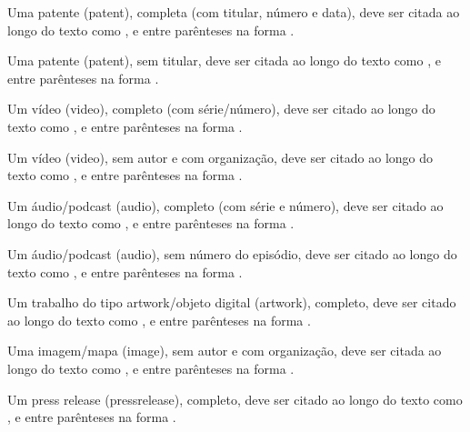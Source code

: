 \documentclass[a4paper,12pt]{article}
\begin{document}
Uma patente (patent), completa (com titular, número e data), deve ser citada ao longo do texto como \citet{pat-1-complete}, e entre parênteses na forma \citep{pat-1-complete}.


Uma patente (patent), sem titular, deve ser citada ao longo do texto como \citet{pat-2-missing-holder}, e entre parênteses na forma \citep{pat-2-missing-holder}.


Um vídeo (video), completo (com série/número), deve ser citado ao longo do texto como \citet{video-1-complete}, e entre parênteses na forma \citep{video-1-complete}.


Um vídeo (video), sem autor e com organização, deve ser citado ao longo do texto como \citet{video-2-missing-author-has-org}, e entre parênteses na forma \citep{video-2-missing-author-has-org}.


Um áudio/podcast (audio), completo (com série e número), deve ser citado ao longo do texto como \citet{audio-1-complete}, e entre parênteses na forma \citep{audio-1-complete}.


Um áudio/podcast (audio), sem número do episódio, deve ser citado ao longo do texto como \citet{audio-2-missing-number}, e entre parênteses na forma \citep{audio-2-missing-number}.


Um trabalho do tipo artwork/objeto digital (artwork), completo, deve ser citado ao longo do texto como \citet{art-obj-1-complete}, e entre parênteses na forma \citep{art-obj-1-complete}.


Uma imagem/mapa (image), sem autor e com organização, deve ser citada ao longo do texto como \citet{img-1-missing-author-has-org}, e entre parênteses na forma \citep{img-1-missing-author-has-org}.


Um press release (pressrelease), completo, deve ser citado ao longo do texto como \citet{press-1-complete}, e entre parênteses na forma \citep{press-1-complete}.

\end{document}
